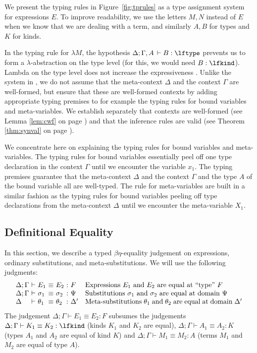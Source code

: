 \documentclass[copyright,creativecommons]{eptcs}
\newcommand{\der}{\,\vdash}
\begin{document}
We present the typing rules in Figure~\ref{fig:tprules} as a type
assignment system for expressions $E$. 
To improve readability, we use the letters $M,N$ instead of $E$ when
we know that we are dealing with a term, and similarly $A,B$ for types and $K$
for kinds.

In the typing rule for $\lambda M$, the hypothesis $\Delta; \Gamma,A
\der B : \lftype$ prevents us to form a $\lambda$-abstraction on the type
level (for this, we would need $B : \lfkind$).  Lambda on the type
level does not increase the expressiveness 
\cite{adams:PhD,harperPfenning:equivalenceLF}.
Unlike the system in \cite{harperPfenning:equivalenceLF}, 
we do not assume that the
meta-context $\Delta$ and the context $\Gamma$ are well-formed, but
ensure that these are well-formed contexts by adding appropriate
typing premises to for example the typing rules for bound variables
and meta-variables. We establish separately that contexts are
well-formed (see Lemma \ref{lem:cwf} on page \pageref{lem:cwf}) and
that the inference rules are valid (see Theorem \ref{thm:synval} on
page \pageref{thm:synval}).  


We concentrate here on explaining the typing rules for bound variables
and meta-variables. The typing rules for bound variables essentially
peel off one type declaration in the context $\Gamma$ until we
encounter the variable $x_1$. The typing premises guarantee that
the meta-context $\Delta$ and the context $\Gamma$ and the type $A$ of the
bound variable all are well-typed. The rule for
meta-variables are built in a similar fashion as the typing rules for
bound variables peeling off type declarations from the meta-context
$\Delta$ until we encounter the meta-variable $X_1$. 


\subsection{Definitional Equality}

In this section, we describe a typed $\beta\eta$-equality judgement on
expressions, ordinary substitutions, and meta-substitutions.
We will use the following judgments: 
\[
\begin{array}[h]{l@{~}c@{~}l@{~}c@{~}l@{~}c@{~}lp{8cm}}
\Delta; \Gamma & \vdash & E_1 & \equiv & E_2 & : & F & Expressions $E_1$
and $E_2$ are equal at ``type'' $F$\\
 \Delta; \Gamma & \vdash & \sigma_1 & \equiv & \sigma_2 & : & \Psi &
 Substitutions $\sigma_1$ and $\sigma_2$ are equal at
domain $\Psi$ \\
\Delta  & \vdash & \theta_1 & \equiv & \theta_2 & : & \Delta' & 
Meta-substitutions $\theta_1$ and $\theta_2$ are equal at domain $\Delta'$ 
\end{array}
\]
The judgement $\Delta; \Gamma \vdash E_1 \equiv E_2 : F$
subsumes the judgements $\Delta; \Gamma \vdash K_1 \equiv K_2 : \lfkind $
  (kinds $K_1$ and $K_2$ are equal), 
$\Delta; \Gamma \vdash A_1 \equiv A_2 : K$ (types $A_1$
and $A_2$ are equal of kind $K$) and 
$\Delta; \Gamma \vdash M_1 \equiv M_2 : A$ (terms $M_1$
and $M_2$ are equal of type $A$).
\end{document}
